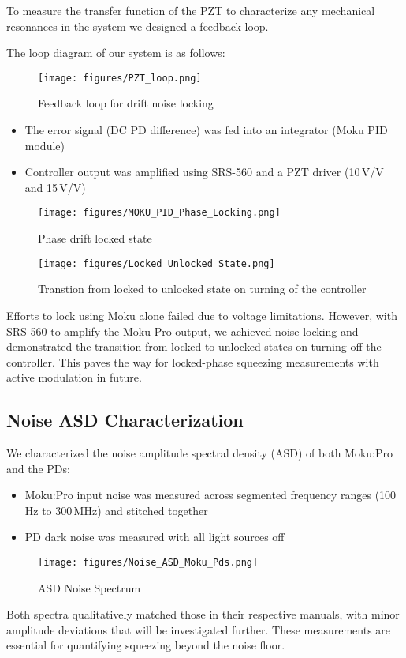 \documentclass[colorlinks=true,pdfstartview=FitV,linkcolor=blue,
citecolor=red,urlcolor=magenta]{ligodoc}
\begin{document}
To measure the transfer function of the PZT to characterize any mechanical resonances in the system we designed a feedback loop.

The loop diagram of our system is as follows:
\begin{figure}[H]
    \centering
    \texttt{[image: figures/PZT\_loop.png]}
   \caption{Feedback loop for drift noise locking}
    \label{fig:enter-label}
\end{figure}
\begin{itemize}
    \item The error signal (DC PD difference) was fed into an integrator (Moku PID module)
    \item Controller output was amplified using SRS-560 and a PZT driver (10\,V/V and 15\,V/V)
\end{itemize}
\begin{figure}[H]
    \centering
    \texttt{[image: figures/MOKU\_PID\_Phase\_Locking.png]}
   \caption{Phase drift locked state}
    \label{fig:enter-label}
\end{figure}

\begin{figure}[H]
    \centering
    \texttt{[image: figures/Locked\_Unlocked\_State.png]}
   \caption{Transtion from locked to unlocked state on turning of the controller}
    \label{fig:enter-label}
\end{figure}
Efforts to lock using Moku alone failed due to voltage limitations. However, with SRS-560 to amplify the Moku Pro output, we achieved noise locking and demonstrated the transition from locked to unlocked states on turning off the controller. This paves the way for locked-phase squeezing measurements with active modulation in future.

\subsection{Noise ASD Characterization}

We characterized the noise amplitude spectral density (ASD) of both Moku:Pro and the PDs:
\begin{itemize}
    \item Moku:Pro input noise was measured across segmented frequency ranges (100\,Hz to 300\,MHz) and stitched together
    \item PD dark noise was measured with all light sources off
\end{itemize}
\begin{figure}[H]
    \centering
    \texttt{[image: figures/Noise\_ASD\_Moku\_Pds.png]}
   \caption{ASD Noise Spectrum}
    \label{fig:enter-label}
\end{figure}
Both spectra qualitatively matched those in their respective manuals, with minor amplitude deviations that will be investigated further. These measurements are essential for quantifying squeezing beyond the noise floor.
\end{document}
